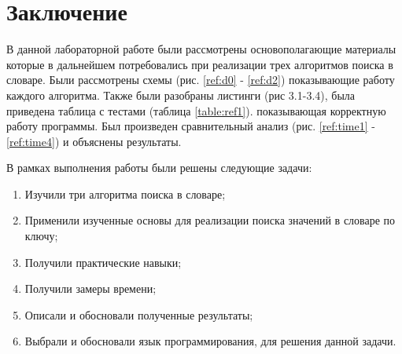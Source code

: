 \chapter*{Заключение}

В данной лабораторной работе были рассмотрены
основополагающие материалы которые в дальнейшем потребовались
при реализации трех алгоритмов поиска в словаре.
Были рассмотрены схемы (рис. \ref{ref:d0} - \ref{ref:d2}) показывающие работу каждого алгоритма.
Также были разобраны листинги (рис 3.1-3.4),
была приведена таблица с тестами (таблица \ref{table:ref1}).
показывающая корректную работу программы.
Был произведен сравнительный анализ (рис. \ref{ref:time1} - \ref{ref:time4})
и объяснены результаты.

В рамках выполнения работы были решены следующие задачи:

\begin{enumerate}
	\item Изучили три алгоритма поиска в словаре;
	\item Применили изученные основы для реализации поиска значений в словаре по ключу;
	\item Получили практические навыки;
	\item Получили замеры времени;
	\item Описали и обосновали полученные результаты;
	\item Выбрали и обосновали язык программирования, для решения данной задачи.
\end{enumerate}